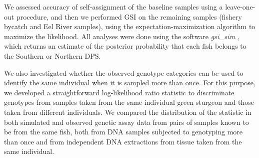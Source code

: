 \documentclass[twocolumn,natbib]{svjour3}       %
\begin{document}
We assessed accuracy of self-assignment of the
baseline samples using a leave-one-out procedure, and then we performed GSI on
the remaining samples (fishery bycatch and Eel River samples), using the
expectation-maximization algorithm \citep{Dempsteretal1977} to maximize the likelihood. All analyses
were done using the software {\em gsi\_sim} \citep{Andersonetal2008,Israeletal2009}, 
which returns an estimate of the posterior probability that each fish
belongs to the Southern or Northern DPS.

We also 
investigated whether the observed genotype
categories can be used to identify the same individual when it is sampled more than once.
For this purpose, we developed a straightforward log-likelihood ratio statistic
to discriminate genotypes from samples taken from the same individual
green sturgeon and those taken from different individuals. We compared the
distribution of the statistic in both simulated and observed genetic
assay data from pairs of samples known to be from the same fish, 
both from DNA samples subjected to genotyping more than once and from
independent DNA extractions from tissue taken from the same individual.
\end{document}
